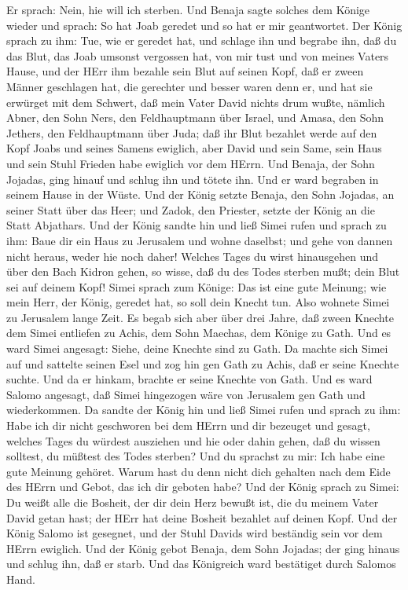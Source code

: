 Er sprach: Nein, hie will ich sterben. Und Benaja sagte solches dem
Könige wieder und sprach: So hat Joab geredet und so hat er mir
geantwortet.  Der König sprach zu ihm: Tue, wie er geredet
hat, und schlage ihn und begrabe ihn, daß du das Blut, das Joab umsonst
vergossen hat, von mir tust und von meines Vaters Hause, 
und der HErr ihm bezahle sein Blut auf seinen Kopf, daß er zween Männer
geschlagen hat, die gerechter und besser waren denn er, und hat sie
erwürget mit dem Schwert, daß mein Vater David nichts drum wußte,
nämlich Abner, den Sohn Ners, den Feldhauptmann über Israel, und Amasa,
den Sohn Jethers, den Feldhauptmann über Juda;  daß ihr
Blut bezahlet werde auf den Kopf Joabs und seines Samens ewiglich, aber
David und sein Same, sein Haus und sein Stuhl Frieden habe ewiglich vor
dem HErrn.  Und Benaja, der Sohn Jojadas, ging hinauf und
schlug ihn und tötete ihn. Und er ward begraben in seinem Hause in der
Wüste.  Und der König setzte Benaja, den Sohn Jojadas, an
seiner Statt über das Heer; und Zadok, den Priester, setzte der König an
die Statt Abjathars.  Und der König sandte hin und ließ
Simei rufen und sprach zu ihm: Baue dir ein Haus zu Jerusalem und wohne
daselbst; und gehe von dannen nicht heraus, weder hie noch daher!
 Welches Tages du wirst hinausgehen und über den Bach
Kidron gehen, so wisse, daß du des Todes sterben mußt; dein Blut sei auf
deinem Kopf!  Simei sprach zum Könige: Das ist eine gute
Meinung; wie mein Herr, der König, geredet hat, so soll dein Knecht tun.
Also wohnete Simei zu Jerusalem lange Zeit.  Es begab sich
aber über drei Jahre, daß zween Knechte dem Simei entliefen zu Achis,
dem Sohn Maechas, dem Könige zu Gath. Und es ward Simei angesagt: Siehe,
deine Knechte sind zu Gath.  Da machte sich Simei auf und
sattelte seinen Esel und zog hin gen Gath zu Achis, daß er seine Knechte
suchte. Und da er hinkam, brachte er seine Knechte von Gath.
 Und es ward Salomo angesagt, daß Simei hingezogen wäre von
Jerusalem gen Gath und wiederkommen.  Da sandte der König
hin und ließ Simei rufen und sprach zu ihm: Habe ich dir nicht
geschworen bei dem HErrn und dir bezeuget und gesagt, welches Tages du
würdest ausziehen und hie oder dahin gehen, daß du wissen solltest, du
müßtest des Todes sterben? Und du sprachst zu mir: Ich habe eine gute
Meinung gehöret.  Warum hast du denn nicht dich gehalten
nach dem Eide des HErrn und Gebot, das ich dir geboten habe?
 Und der König sprach zu Simei: Du weißt alle die Bosheit,
der dir dein Herz bewußt ist, die du meinem Vater David getan hast; der
HErr hat deine Bosheit bezahlet auf deinen Kopf.  Und der
König Salomo ist gesegnet, und der Stuhl Davids wird beständig sein vor
dem HErrn ewiglich.  Und der König gebot Benaja, dem Sohn
Jojadas; der ging hinaus und schlug ihn, daß er starb. Und das
Königreich ward bestätiget durch Salomos Hand.

